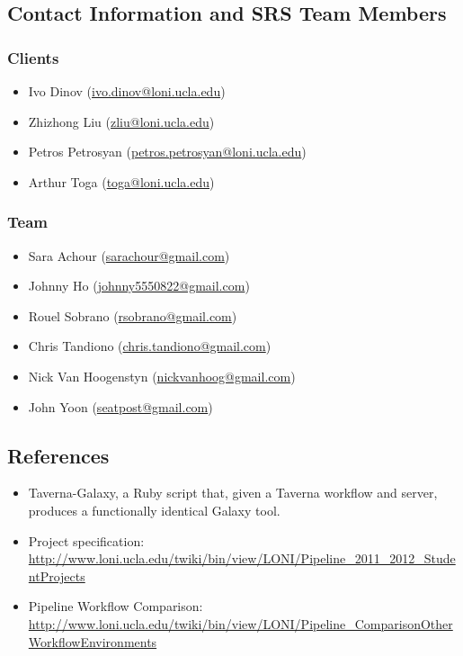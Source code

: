 \documentclass[12pt]{article}
\begin{document}
\subsection{Contact Information and SRS Team Members}
\subsubsection{Clients}
\begin{itemize}
\item Ivo Dinov (\href{mailto:ivo.dinov@loni.ucla.edu}{ivo.dinov@loni.ucla.edu})
\item Zhizhong Liu (\href{mailto:zliu@loni.ucla.edu}{zliu@loni.ucla.edu})
\item Petros Petrosyan (\href{mailto:petros.petrosyan@loni.ucla.edu}{petros.petrosyan@loni.ucla.edu})
\item Arthur Toga (\href{mailto:toga@loni.ucla.edu}{toga@loni.ucla.edu})
\end{itemize}


\subsubsection{Team}
\begin{itemize}
\item Sara Achour (\href{mailto:sarachour@gmail.com}{sarachour@gmail.com})
\item Johnny Ho (\href{mailto:johnny5550822@gmail.com}{johnny5550822@gmail.com})
\item Rouel Sobrano (\href{mailto:rsobrano@gmail.com}{rsobrano@gmail.com})
\item Chris Tandiono (\href{mailto:chris.tandiono@gmail.com}{chris.tandiono@gmail.com})
\item Nick Van Hoogenstyn (\href{mailto:nickvanhoog@gmail.com}{nickvanhoog@gmail.com})
\item John Yoon (\href{mailto:seatpost@gmail.com}{seatpost@gmail.com})
\end{itemize}


\subsection{References}
\begin{itemize}
\item Taverna-Galaxy, a Ruby script that, given a Taverna workflow and server, produces a functionally identical Galaxy tool.
\item Project specification: \url{http://www.loni.ucla.edu/twiki/bin/view/LONI/Pipeline_2011_2012_StudentProjects}
\item Pipeline Workflow Comparison: \url{http://www.loni.ucla.edu/twiki/bin/view/LONI/Pipeline_ComparisonOtherWorkflowEnvironments}
\end{itemize}
\end{document}
